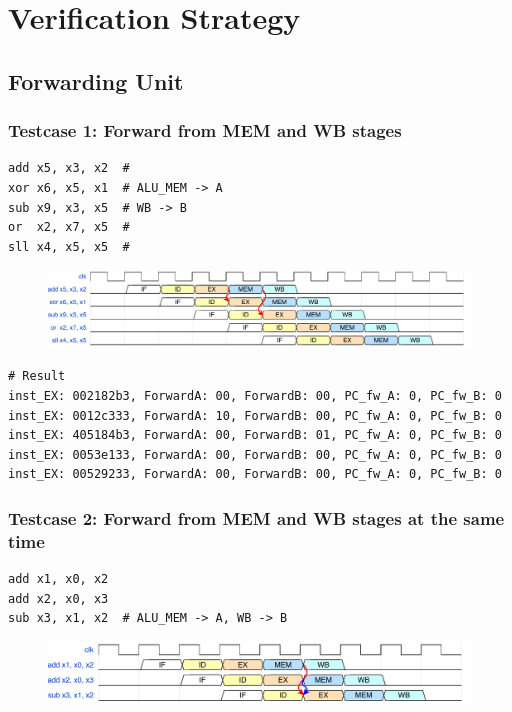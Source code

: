 \documentclass[12pt,a4paper,oneside]{book} %
\begin{document}
\chapter{Verification Strategy}
\section{Forwarding Unit}
\subsection{Testcase 1: Forward from MEM and WB stages}
\begin{verbatim}
add x5, x3, x2  #
xor x6, x5, x1  # ALU_MEM -> A
sub x9, x3, x5  # WB -> B
or  x2, x7, x5  #
sll x4, x5, x5  #
\end{verbatim}

\begin{figure}[H]
    \centering
    \includegraphics[scale=0.58]{images/tb/fw_case1.pdf}
\end{figure}

\begin{verbatim}
# Result
inst_EX: 002182b3, ForwardA: 00, ForwardB: 00, PC_fw_A: 0, PC_fw_B: 0
inst_EX: 0012c333, ForwardA: 10, ForwardB: 00, PC_fw_A: 0, PC_fw_B: 0
inst_EX: 405184b3, ForwardA: 00, ForwardB: 01, PC_fw_A: 0, PC_fw_B: 0
inst_EX: 0053e133, ForwardA: 00, ForwardB: 00, PC_fw_A: 0, PC_fw_B: 0
inst_EX: 00529233, ForwardA: 00, ForwardB: 00, PC_fw_A: 0, PC_fw_B: 0
\end{verbatim}

\subsection{Testcase 2: Forward from MEM and WB stages at the same time}
\begin{verbatim}
add x1, x0, x2
add x2, x0, x3
sub x3, x1, x2  # ALU_MEM -> A, WB -> B
\end{verbatim}

\begin{figure}[H]
    \centering
    \includegraphics[scale=0.58]{images/tb/fw_case2.pdf}
\end{figure}
\end{document}
